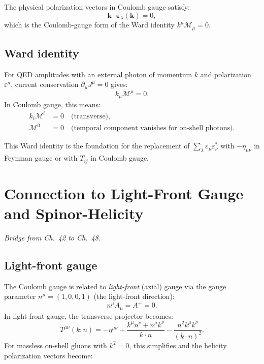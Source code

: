 \documentclass[12pt]{article}
\begin{document}
The physical polarization vectors in Coulomb gauge satisfy:
\begin{equation}\label{eq:transverse-pol}
  \mathbf{k}\cdot\boldsymbol\varepsilon_\lambda(\mathbf{k}) = 0,
\end{equation}
which is the Coulomb-gauge form of the Ward identity $k^\mu\mathcal{M}_\mu = 0$.

\subsection{Ward identity}

For QED amplitudes with an external photon of momentum $k$ and polarization
$\varepsilon^\mu$, current conservation $\partial_\mu J^\mu = 0$ gives:
\begin{equation}\label{eq:ward}
  k_\mu \mathcal{M}^\mu = 0.
\end{equation}
In Coulomb gauge, this means:
\begin{align}
  k_i \mathcal{M}^i &= 0 \quad\text{(transverse)}, \\
  \mathcal{M}^0 &= 0 \quad\text{(temporal component vanishes for on-shell photons)}.
\end{align}

This Ward identity is the foundation for the replacement of $\sum_\lambda \varepsilon_\mu\varepsilon_\nu^*$
with $-\eta_{\mu\nu}$ in Feynman gauge or with $T_{ij}$ in Coulomb gauge.

\section{Connection to Light-Front Gauge and Spinor-Helicity}

\textit{Bridge from Ch.~42 to Ch.~48.}

\subsection{Light-front gauge}

The Coulomb gauge is related to \emph{light-front} (axial) gauge via the gauge
parameter $n^\mu = (1,0,0,1)$ (the light-front direction):
\begin{equation}
  n^\mu A_\mu = A^+ = 0.
\end{equation}
In light-front gauge, the transverse projector becomes:
\begin{equation}
  T^{\mu\nu}(k;n) = -\eta^{\mu\nu}
  + \frac{k^\mu n^\nu + n^\mu k^\nu}{k\cdot n}
  - \frac{n^2 k^\mu k^\nu}{(k\cdot n)^2}.
\end{equation}
For massless on-shell gluons with $k^2=0$, this simplifies and the helicity
polarization vectors become:
\end{document}
